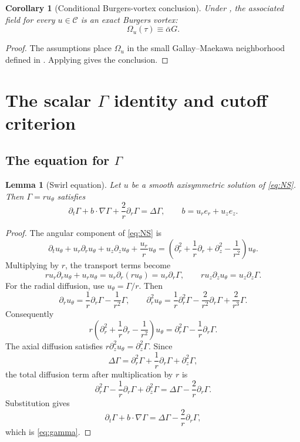 \documentclass[11pt]{amsart}
\theoremstyle{plain}
\newtheorem{lemma}[theorem]{Lemma}
\newtheorem{corollary}[theorem]{Corollary}
\theoremstyle{definition}
\theoremstyle{remark}
\numberwithin{equation}{section}
\begin{document}
\begin{corollary}[Conditional Burgers-vortex conclusion]
\label{cor:bv-association}
Under , the associated field for every
\(u\in\mathcal C\) is an exact Burgers vortex:
\[
   \Omega_u(\tau)\equiv\bar\alpha G .
\]
\end{corollary}

\begin{proof}
The assumptions place \(\Omega_u\) in the small Gallay--Maekawa neighborhood
defined in .  Applying 
gives the conclusion.
\end{proof}

\section{The scalar \texorpdfstring{\(\Gamma\)}{Gamma} identity and cutoff criterion}
\label{sec:gamma}

\subsection{The equation for \texorpdfstring{\(\Gamma\)}{Gamma}}

\begin{lemma}[Swirl equation]\label{lem:gamma-equation}
Let \(u\) be a smooth axisymmetric solution of \eqref{eq:NS}.  Then
\(\Gamma=ru_\theta\) satisfies
\begin{equation}\label{eq:gamma}
   \partial_t\Gamma
   +b\cdot\nabla\Gamma
   +\frac2r\partial_r\Gamma
   =
   \Delta\Gamma,
   \qquad b=u_re_r+u_ze_z .
\end{equation}
\end{lemma}

\begin{proof}
The angular component of \eqref{eq:NS} is
\[
   \partial_tu_\theta+u_r\partial_r u_\theta+u_z\partial_z u_\theta
   +\frac{u_r}{r}u_\theta
   =
   \left(\partial_r^2+\frac1r\partial_r+\partial_z^2-\frac1{r^2}\right)
   u_\theta .
\]
Multiplying by \(r\), the transport terms become
\[
   r u_r\partial_ru_\theta+u_ru_\theta
   =
   u_r\partial_r(ru_\theta)
   =
   u_r\partial_r\Gamma,
   \qquad
   r u_z\partial_zu_\theta
   =
   u_z\partial_z\Gamma .
\]
For the radial diffusion, use \(u_\theta=\Gamma/r\).  Then
\[
   \partial_ru_\theta
   =
   \frac1r\partial_r\Gamma-\frac1{r^2}\Gamma,
   \qquad
   \partial_r^2u_\theta
   =
   \frac1r\partial_r^2\Gamma
   -\frac2{r^2}\partial_r\Gamma
   +\frac2{r^3}\Gamma .
\]
Consequently
\[
   r\left(\partial_r^2+\frac1r\partial_r-\frac1{r^2}\right)u_\theta
   =
   \partial_r^2\Gamma-\frac1r\partial_r\Gamma .
\]
The axial diffusion satisfies \(r\partial_z^2u_\theta=\partial_z^2\Gamma\).
Since
\[
   \Delta\Gamma
   =
   \partial_r^2\Gamma+\frac1r\partial_r\Gamma+\partial_z^2\Gamma,
\]
the total diffusion term after multiplication by \(r\) is
\[
   \partial_r^2\Gamma-\frac1r\partial_r\Gamma+\partial_z^2\Gamma
   =
   \Delta\Gamma-\frac2r\partial_r\Gamma .
\]
Substitution gives
\[
   \partial_t\Gamma+b\cdot\nabla\Gamma
   =
   \Delta\Gamma-\frac2r\partial_r\Gamma,
\]
which is \eqref{eq:gamma}.
\end{proof}
\end{document}
